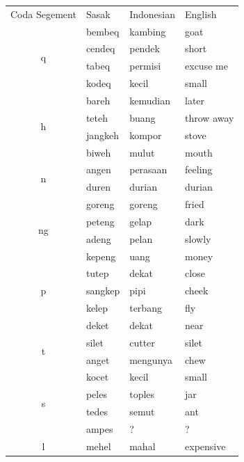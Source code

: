 \documentclass[12pt]{ouparticle}
\begin{document}
\begin{table}[]
    \centering
    \begin{tabular}{c|l l l}
    Coda Segement & Sasak & Indonesian & English  \\
    \multirow{4}{*}{q} & bembeq & kambing & goat\\
                       & cendeq & pendek & short\\
                       & tabeq & permisi & excuse me\\
                       & kodeq & kecil   & small \\
    \hline
    \multirow{4}{*}{h} & bareh & kemudian & later\\
                       & teteh & buang & throw away\\
                       & jangkeh & kompor & stove\\
                       & biweh & mulut   & mouth \\
    \hline                   
    \multirow{2}{*}{n} & angen  & perasaan & feeling\\
                       & duren & durian & durian\\
    \hline                   
    \multirow{4}{*}{ng} & goreng & goreng & fried\\
                       & peteng & gelap & dark\\
                       & adeng & pelan & slowly\\
                       & kepeng & uang   & money \\
    \hline                   
    \multirow{3}{*}{p} & tutep & dekat & close\\
                       & sangkep & pipi & cheek\\
                       & kelep & terbang & fly\\
    \hline                   
    \multirow{4}{*}{t} & deket & dekat & near\\
                       & silet & cutter & silet\\
                       & anget & mengunya & chew\\
                       & kocet & kecil   & small \\
    \hline                   
    \multirow{2}{*}{s} & peles & toples & jar\\
                       & tedes & semut & ant\\
                       & ampes & ?     & ? \\
    \hline
    \multirow{2}{*}{l} & mehel & mahal & expensive\\

\end{tabular}
\end{table}
\end{document}
